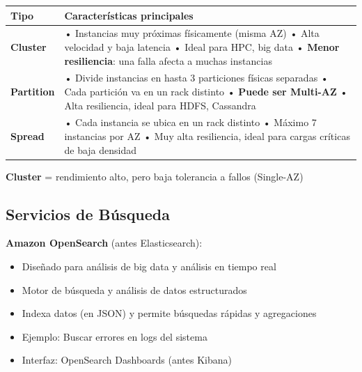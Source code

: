 \documentclass[12pt,a4paper]{report}
\newcommand{\important}[1]{\textcolor{dangerred}{\textbf{#1}}}
\begin{document}
\begin{center}
\begin{longtable}{|p{2.5cm}|p{10cm}|}
\hline
\cellcolor{awsblue!20}\textbf{Tipo} & \cellcolor{awsblue!20}\textbf{Características principales} \\
\hline
\textbf{Cluster} & • Instancias muy próximas físicamente (misma AZ) \newline • Alta velocidad y baja latencia \newline • Ideal para HPC, big data \newline • \important{Menor resiliencia}: una falla afecta a muchas instancias \\
\hline
\textbf{Partition} & • Divide instancias en hasta 3 particiones físicas separadas \newline • Cada partición va en un rack distinto \newline • \important{Puede ser Multi-AZ} \newline • Alta resiliencia, ideal para HDFS, Cassandra \\
\hline
\textbf{Spread} & • Cada instancia se ubica en un rack distinto \newline • Máximo 7 instancias por AZ \newline • Muy alta resiliencia, ideal para cargas críticas de baja densidad \\
\hline
\end{longtable}
\end{center}

\textbf{Cluster} = rendimiento alto, pero baja tolerancia a fallos (Single-AZ)

\subsection{Servicios de Búsqueda}

\textbf{Amazon OpenSearch} (antes Elasticsearch):
\begin{itemize}
    \item Diseñado para análisis de big data y análisis en tiempo real
    \item Motor de búsqueda y análisis de datos estructurados
    \item Indexa datos (en JSON) y permite búsquedas rápidas y agregaciones
    \item Ejemplo: Buscar errores en logs del sistema
    \item Interfaz: OpenSearch Dashboards (antes Kibana)
\end{itemize}
\end{document}
